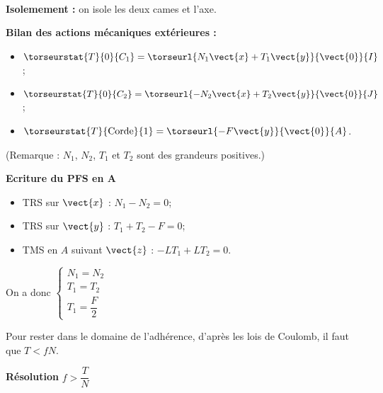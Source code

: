\ifprof
\begin{corrige}~\\

\textbf{Isolemement : } on isole les deux cames et l'axe. 

\textbf{Bilan des actions mécaniques extérieures :}
\begin{itemize}
\item $\torseurstat{T}{0}{C_1} = \torseurl{N_1 \vect{x} + T_1 \vect{y}}{\vect{0}}{I}$;
\item $\torseurstat{T}{0}{C_2} = \torseurl{-N_2 \vect{x} + T_2 \vect{y}}{\vect{0}}{J}$;
\item $\torseurstat{T}{\text{Corde}}{1} = \torseurl{-F\vect{y} }{\vect{0}}{A}$.
\end{itemize}

(Remarque : $N_1$, $N_2$, $T_1$ et $T_2$ sont des grandeurs positives.)

\textbf{Ecriture du PFS en A}
\begin{itemize}
\item TRS sur $\vect{x}$ : $N_1 - N_2 = 0$;
\item TRS sur $\vect{y}$ : $T_1 +T _2  - F = 0$;
\item TMS en $A$ suivant $\vect{z}$ : $- L T_1 + L T_2 = 0$. 
\end{itemize}


On a donc 
$\left\{ 
\begin{array}{l}
N_1 = N_2 \\
T_1 = T_2 \\
T_1 = \dfrac{F}{2}
\end{array}
\right.$

Pour rester dans le domaine de l'adhérence, d'après les lois de Coulomb, il faut que $T< fN$. 

\textbf{Résolution}
$f > \dfrac{T}{N}$

\end{corrige}
\else
\fi


\ifprof
\begin{corrige}~\\
\end{corrige}
\else
\fi

\ifprof
\begin{corrige}~\\
\end{corrige}
\else
\fi

